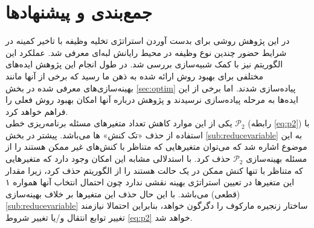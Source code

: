 \chapter{جمع‌بندی و پیشنهاد‌ها}
در این پژوهش روشی برای بدست آوردن استراتژی تخلیه وظیفه با تاخیر کمینه در شرایط حضور چندین نوع وظیفه در محیط رایانش لبه‌ای معرفی شد. عملکرد این الگوریتم نیز با کمک شبیه‌سازی بررسی شد. در طول انجام این پژوهش ایده‌های مختلفی برای بهبود روش ارائه شده به ذهن ما رسید که برخی از آنها مانند بهینه‌سازی‌های معرفی شده در بخش \ref{sec:optim} پیاده‌سازی شدند. اما برخی از این ایده‌ها به مرحله پیاده‌سازی نرسیدند و پژوهش درباره آنها امکان بهبود روش فعلی را فراهم خواهد کرد. \\

یکی از این موارد کاهش تعداد متغیرهای مسئله برنامه‌ریزی خطی
$\mathcal{P}_2$
(رابطه \ref{eq:p2})
 با استفاده از حذف «تک کنش» ها می‌باشد. پیشتر در بخش \ref{sub:reducevariable} به این موضوع اشاره شد که می‌توان متغیرهایی که متناظر با کنش‌های غیر ممکن هستند را از مسئله بهینه‌سازی 
 $\mathcal{P}_2$
 حذف کرد. با استدلالی مشابه این امکان وجود دارد که متغیرهایی که متناظر با تنها کنش ممکن در یک حالت هستند را از الگوریتم حذف کرد، زیرا مقدار این متغیرها در تعیین استراتژی بهینه نقشی ندارد چون احتمال انتخاب آنها همواره ۱ (قطعی) می‌باشد. با این حال حذف این متغیرها بر خلاف بهینه‌سازی \ref{sub:reducevariable} ساختار زنجیره مارکوف را دگرگون خواهد، بنابراین احتمالا نیازمند تغییر توابع انتقال و/یا تغییر شروط \ref{eq:p2} خواهد شد.
\clearpage